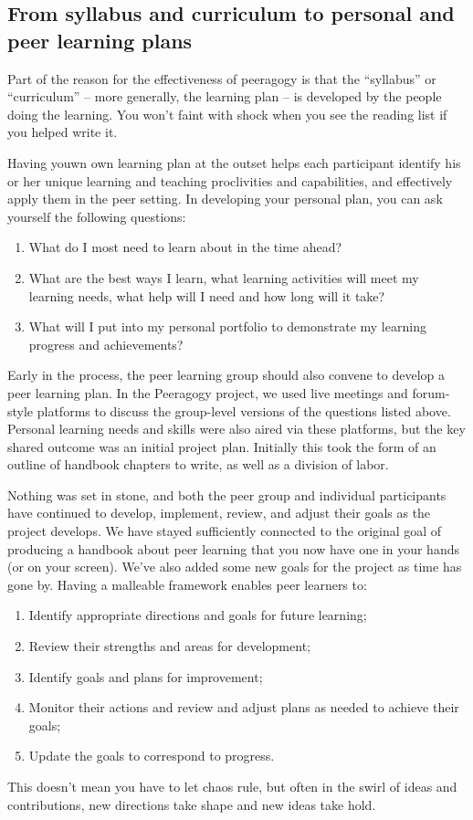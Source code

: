 \subsection{From syllabus and curriculum to personal and peer learning
plans}

Part of the reason for the effectiveness of peeragogy is that the
``syllabus'' or ``curriculum'' -- more generally, the learning plan --
is developed by the people doing the learning. You won't faint with
shock when you see the reading list if you helped write it.

Having youwn own learning plan at the outset helps each participant
identify his or her unique learning and teaching proclivities and
capabilities, and effectively apply them in the peer setting. In
developing your personal plan, you can ask yourself the following
questions:

\begin{enumerate}
\item
  What do I most need to learn about in the time ahead?
\item
  What are the best ways I learn, what learning activities will meet my
  learning needs, what help will I need and how long will it take?
\item
  What will I put into my personal portfolio to demonstrate my learning
  progress and achievements?
\end{enumerate}
Early in the process, the peer learning group should also convene to
develop a peer learning plan. In the Peeragogy project, we used live
meetings and forum-style platforms to discuss the group-level versions
of the questions listed above. Personal learning needs and skills were
also aired via these platforms, but the key shared outcome was an
initial project plan. Initially this took the form of an outline of
handbook chapters to write, as well as a division of labor.

Nothing was set in stone, and both the peer group and individual
participants have continued to develop, implement, review, and adjust
their goals as the project develops. We have stayed sufficiently
connected to the original goal of producing a handbook about peer
learning that you now have one in your hands (or on your screen). We've
also added some new goals for the project as time has gone by. Having a
malleable framework enables peer learners to:

\begin{enumerate}
\item
  Identify appropriate directions and goals for future learning;
\item
  Review their strengths and areas for development;
\item
  Identify goals and plans for improvement;
\item
  Monitor their actions and review and adjust plans as needed to achieve
  their goals;
\item
  Update the goals to correspond to progress.
\end{enumerate}
This doesn't mean you have to let chaos rule, but often in the swirl of
ideas and contributions, new directions take shape and new ideas take
hold.

